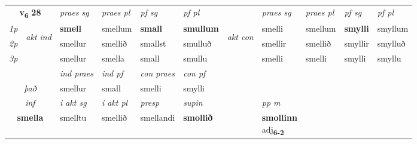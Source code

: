\noindent
\begin{tabular}{lllllllllll} \toprule
\multicolumn{2}{c}{\textbf{v{\textsubscript{6}}} \Large{\textbf{28}}}  &  \textit{praes sg}  & \textit{praes pl}  &\textit{ pf sg} & \textit{pf pl} &  &  \textit{praes sg}  & \textit{praes pl}  & \textit{pf sg} & \textit{pf pl } \\*
	\cmidrule{3-6} \cmidrule{8-11}
 {\textit{1p}} & \multirow{3}{*}{\begin{turn}{90}\textit{akt ind}\end{turn}} & \textbf{smell} & smellum & \textbf{small} & \textbf{smullum} & \multirow{3}{*}{\begin{turn}{90}\textit{akt con}\end{turn}} &smelli & smellum & \textbf{smylli} & smyllum\\*
 {\textit{2p}} &  &  smellur  & smellið & smallst & smulluð & & smellir & smellið & smyllir & smylluð \\*
{\textit{3p}} &  & smellur & smella & small & smullu & & smelli & smelli& smylli & smyllu \\*
\cmidrule{3-6} \cmidrule{8-11}

   & &  \textit{ind praes} & \textit{ind pf} & \textit{con praes} & \textit{con pf} \\*
\multicolumn{2}{c}{ \textit{það} } & smellur & small & smelli & smylli \\*

\cmidrule{3-8}
   \multicolumn{2}{c}{\textit{inf}}  & \textit{i akt sg} & \textit{i akt pl}   & \textit{presp} & \textit{supin}  && \textit{pp m} \\*
  \multicolumn{2}{c}{\textbf{smella}} & smelltu  & smellið   & smellandi &  \textbf{smollið}  && \specialcell{\textbf{smollinn} \\ adj\textbf{\textsubscript{6-2}}} \\*
\end{tabular}

